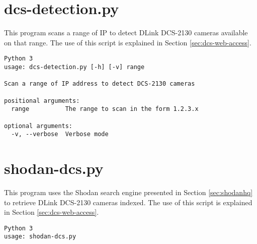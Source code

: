 \section{dcs-detection.py}

This program scans a range of IP to detect DLink DCS-2130 cameras available on that range.
The use of this script is explained in Section \ref{sec:dcs-web-access}.

\begin{verbatim}
Python 3
usage: dcs-detection.py [-h] [-v] range

Scan a range of IP address to detect DCS-2130 cameras

positional arguments:
  range          The range to scan in the form 1.2.3.x

optional arguments:
  -v, --verbose  Verbose mode
\end{verbatim}

\section{shodan-dcs.py}

This program uses the Shodan search engine presented in Section \ref{sec:shodanhq} to retrieve DLink DCS-2130 cameras indexed.
The use of this script is explained in Section \ref{sec:dcs-web-access}.

\begin{verbatim}
Python 3
usage: shodan-dcs.py
\end{verbatim}